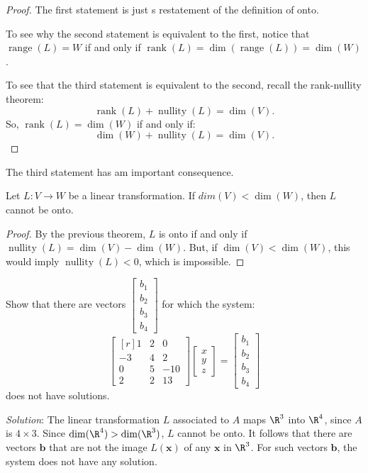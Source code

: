 \documentclass[12pt]{article}
\DeclareMathOperator{\range}{range}
\DeclareMathOperator{\rank}{rank}
\DeclareMathOperator{\nullity}{nullity}
\begin{document}
\begin{proof}
The first statement is just s restatement of the definition of onto. 

To see why the second statement is equivalent to the first, notice that $\range(L)=W$ if and only if $\rank(L)=\dim(\range(L))=\dim(W)$.

To see that the third statement is equivalent to the second, recall the rank-nullity theorem:
\[
\rank(L)+\nullity(L)=\dim(V).
\]
So, $\rank(L)=\dim(W)$ if and only if:
\[
\dim(W)+\nullity(L)=\dim(V).
\]
\end{proof}

The third statement has am important consequence.

\begin{corollary} Let $L:V\to W$ be a linear transformation. If $dim(V)<\dim(W)$, then $L$ cannot be onto.  
\end{corollary}

\begin{proof}
By the previous theorem, $L$ is onto if and only if $\nullity(L)=\dim(V)-\dim(W)$. But, if $\dim(V)<\dim(W)$, this would imply $\nullity(L)<0$, which is impossible.
\end{proof}

\begin{example} Show that there are vectors $\begin{bmatrix}b_1\\b_2\\b_3\\b_4\end{bmatrix}$ for which the system:
\[
\begin{bmatrix*}[r]1&2&0\\-3&4&2\\0&5&-10\\2&2&13\end{bmatrix*}
\begin{bmatrix}x\\y\\z\end{bmatrix}=
\begin{bmatrix}b_1\\b_2\\b_3\\b_4\end{bmatrix}
\]
does not have solutions.

\emph{Solution}: The linear transformation $L$ associated to $A$ maps $\R^3$ into $\R^4$, since $A$ is $4\times3$. Since $\dim(\R^4)>\dim(\R^3)$, $L$ cannot be onto. It follows that there are vectors $\mathbf{b}$ that are not the image $L(\mathbf{x})$ of any $\mathbf{x}$ in $\R^3$. For such vectors $\mathbf{b}$, the system does not have any solution.
\end{example}
\end{document}

